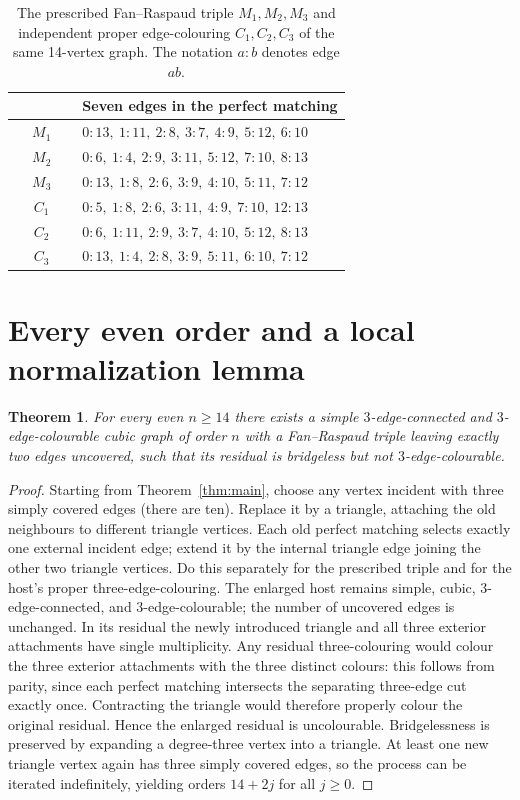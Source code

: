 \documentclass[11pt]{article}
\newtheorem{theorem}{Theorem}
\begin{document}
\begin{table}[ht]
\centering\small
\begin{tabular}{@{}c p{0.80\linewidth}@{}}
\toprule
 & Seven edges in the perfect matching\\ \midrule
$M_1$ & $0\!:\!13,\ 1\!:\!11,\ 2\!:\!8,\ 3\!:\!7,\ 4\!:\!9,\ 5\!:\!12,\ 6\!:\!10$\\
$M_2$ & $0\!:\!6,\ 1\!:\!4,\ 2\!:\!9,\ 3\!:\!11,\ 5\!:\!12,\ 7\!:\!10,\ 8\!:\!13$\\
$M_3$ & $0\!:\!13,\ 1\!:\!8,\ 2\!:\!6,\ 3\!:\!9,\ 4\!:\!10,\ 5\!:\!11,\ 7\!:\!12$\\ \midrule
$C_1$ & $0\!:\!5,\ 1\!:\!8,\ 2\!:\!6,\ 3\!:\!11,\ 4\!:\!9,\ 7\!:\!10,\ 12\!:\!13$\\
$C_2$ & $0\!:\!6,\ 1\!:\!11,\ 2\!:\!9,\ 3\!:\!7,\ 4\!:\!10,\ 5\!:\!12,\ 8\!:\!13$\\
$C_3$ & $0\!:\!13,\ 1\!:\!4,\ 2\!:\!8,\ 3\!:\!9,\ 5\!:\!11,\ 6\!:\!10,\ 7\!:\!12$\\ \bottomrule
\end{tabular}
\caption{The prescribed Fan--Raspaud triple $M_1,M_2,M_3$ and independent proper edge-colouring $C_1,C_2,C_3$ of the same 14-vertex graph. The notation $a\!:\!b$ denotes edge $ab$.}\label{tab:matchings}
\end{table}

\section{Every even order and a local normalization lemma}
\begin{theorem}\label{thm:infty}
For every even $n\ge14$ there exists a simple $3$-edge-connected and $3$-edge-colourable cubic graph of order $n$ with a Fan--Raspaud triple leaving exactly two edges uncovered, such that its residual is bridgeless but not $3$-edge-colourable.
\end{theorem}
\begin{proof}
Starting from Theorem~\ref{thm:main}, choose any vertex incident with three simply covered edges (there are ten). Replace it by a triangle, attaching the old neighbours to different triangle vertices. Each old perfect matching selects exactly one external incident edge; extend it by the internal triangle edge joining the other two triangle vertices. Do this separately for the prescribed triple and for the host's proper three-edge-colouring. The enlarged host remains simple, cubic, $3$-edge-connected, and $3$-edge-colourable; the number of uncovered edges is unchanged. In its residual the newly introduced triangle and all three exterior attachments have single multiplicity. Any residual three-colouring would colour the three exterior attachments with the three distinct colours: this follows from parity, since each perfect matching intersects the separating three-edge cut exactly once. Contracting the triangle would therefore properly colour the original residual. Hence the enlarged residual is uncolourable. Bridgelessness is preserved by expanding a degree-three vertex into a triangle. At least one new triangle vertex again has three simply covered edges, so the process can be iterated indefinitely, yielding orders $14+2j$ for all $j\ge0$.
\end{proof}
\end{document}
